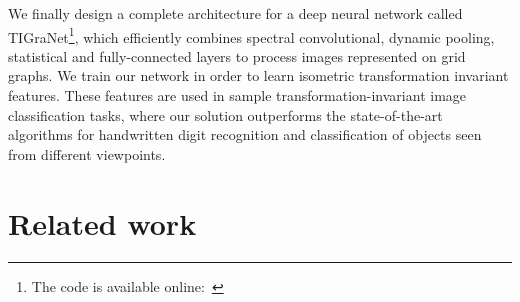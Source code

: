 \documentclass[10pt,journal,compsoc]{IEEEtran}
\newcommand{\renata}[1]{\textcolor{black}{#1}}
\begin{document}
	We finally design a complete architecture for a deep neural network called TIGraNet\footnote{The code is available online:~}, which efficiently combines spectral convolutional, dynamic pooling, statistical and fully-connected layers to process images represented on grid graphs. We train our network in order to learn isometric transformation invariant features. These features are used in sample transformation-invariant image classification tasks, where our solution outperforms the state-of-the-art algorithms for handwritten digit recognition and classification of objects seen from different viewpoints.
	
	\section{Related work}
	\label{s:related_work}
	
\end{document}
